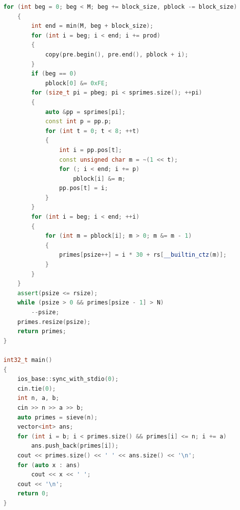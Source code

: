 \documentclass[10pt,landscape,a4paper,twocolumn]{article}
\begin{document}
\begin{lstlisting}[language=C++]
    for (int beg = 0; beg < M; beg += block_size, pblock -= block_size)
    {
        int end = min(M, beg + block_size);
        for (int i = beg; i < end; i += prod)
        {
            copy(pre.begin(), pre.end(), pblock + i);
        }
        if (beg == 0)
            pblock[0] &= 0xFE;
        for (size_t pi = pbeg; pi < sprimes.size(); ++pi)
        {
            auto &pp = sprimes[pi];
            const int p = pp.p;
            for (int t = 0; t < 8; ++t)
            {
                int i = pp.pos[t];
                const unsigned char m = ~(1 << t);
                for (; i < end; i += p)
                    pblock[i] &= m;
                pp.pos[t] = i;
            }
        }
        for (int i = beg; i < end; ++i)
        {
            for (int m = pblock[i]; m > 0; m &= m - 1)
            {
                primes[psize++] = i * 30 + rs[__builtin_ctz(m)];
            }
        }
    }
    assert(psize <= rsize);
    while (psize > 0 && primes[psize - 1] > N)
        --psize;
    primes.resize(psize);
    return primes;
}

int32_t main()
{
    ios_base::sync_with_stdio(0);
    cin.tie(0);
    int n, a, b;
    cin >> n >> a >> b;
    auto primes = sieve(n);
    vector<int> ans;
    for (int i = b; i < primes.size() && primes[i] <= n; i += a)
        ans.push_back(primes[i]);
    cout << primes.size() << ' ' << ans.size() << '\n';
    for (auto x : ans)
        cout << x << ' ';
    cout << '\n';
    return 0;
}

\end{lstlisting}
\end{document}
